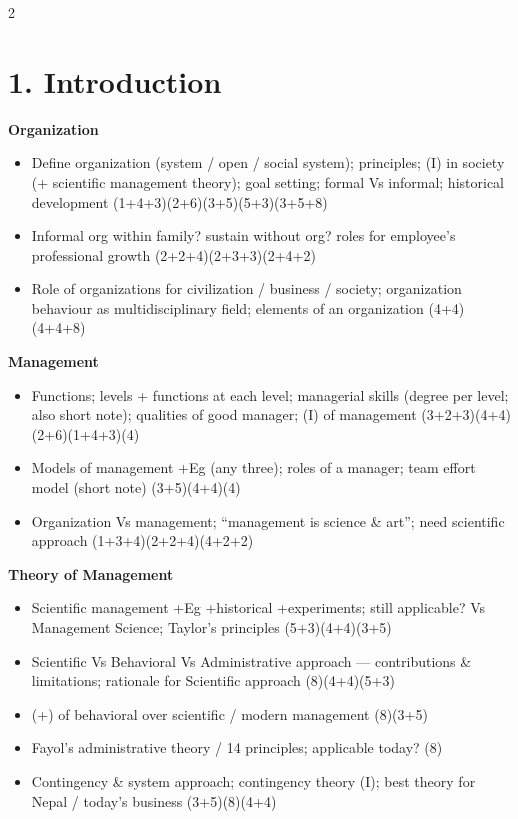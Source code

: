 \documentclass[10pt]{article}
\begin{document}
\begin{multicols}{2}
\footnotesize

\section*{1. Introduction}
\textbf{Organization}
\begin{itemize}
  \item Define organization (system / open / social system); principles; (I) in society (+ scientific management theory); goal setting; formal Vs informal; historical development \hfill (1+4+3)(2+6)(3+5)(5+3)(3+5+8)
  \item Informal org within family? sustain without org? roles for employee's professional growth \hfill (2+2+4)(2+3+3)(2+4+2)
  \item Role of organizations for civilization / business / society; organization behaviour as multidisciplinary field; elements of an organization \hfill (4+4)(4+4+8)
\end{itemize}
\textbf{Management}
\begin{itemize}
  \item Functions; levels + functions at each level; managerial skills (degree per level; also short note); qualities of good manager; (I) of management \hfill (3+2+3)(4+4)(2+6)(1+4+3)(4)
  \item Models of management +Eg (any three); roles of a manager; team effort model (short note) \hfill (3+5)(4+4)(4)
  \item Organization Vs management; ``management is science \& art''; need scientific approach \hfill (1+3+4)(2+2+4)(4+2+2)
\end{itemize}
\textbf{Theory of Management}
\begin{itemize}
  \item Scientific management +Eg +historical +experiments; still applicable? Vs Management Science; Taylor's principles \hfill (5+3)(4+4)(3+5)
  \item Scientific Vs Behavioral Vs Administrative approach --- contributions \& limitations; rationale for Scientific approach \hfill (8)(4+4)(5+3)
  \item (+) of behavioral over scientific / modern management \hfill (8)(3+5)
  \item Fayol's administrative theory / 14 principles; applicable today? \hfill (8)
  \item Contingency \& system approach; contingency theory (I); best theory for Nepal / today's business \hfill (3+5)(8)(4+4)

\end{itemize}
\end{multicols}
\end{document}
